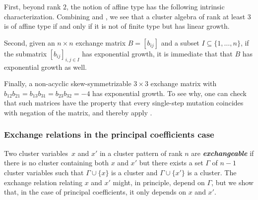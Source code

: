 \documentclass{amsart}
\theoremstyle{definition}
\theoremstyle{remark}
\numberwithin{equation}{section}
\newcommand{\newword}[1]{\textbf{\emph{#1}}}
\newcommand{\set}[1]{{\lbrace #1 \rbrace}}
\newcommand{\0}{{\mathbf{0}}}
\begin{document}
First, beyond rank $2$, the notion of affine type has the following intrinsic characterization.
Combining \cite[Theorem~3.5]{Seven} and \cite[Theorem~1.1]{FeShThTu12}, we see that a cluster algebra of rank at least $3$ is of affine type if and only if it is not of finite type but has linear growth.

Second, given an $n\times n$ exchange matrix $B=[b_{ij}]$ and a subset $I\subseteq\set{1,\ldots,n}$, if the submatrix $[b_{ij}]_{i,j\in I}$ has exponential growth, it is immediate that that $B$ has exponential growth as well.

Finally, a non-acyclic skew-symmetrizable $3\times3$ exchange matrix with $b_{12}b_{21}=b_{13}b_{31}=b_{23}b_{32}=-4$ has exponential growth.
To see why, one can check that such matrices have the property that every single-step mutation coincides with negation of the matrix, and thereby apply \cite[Theorem~1.1]{FeShThTu12}.

\subsubsection{Exchange relations in the principal coefficients case}\label{exch rel sec}
Two cluster variables~$x$ and $x'$ in a cluster pattern of rank $n$  are \newword{exchangeable} if there is no cluster containing both $x$ and $x'$ but there exists a set $\Gamma$ of $n-1$ cluster variables such that $\Gamma\cup\set{x}$ is a cluster and $\Gamma\cup\set{x'}$ is a cluster.
The exchange relation relating $x$ and $x'$ might, in principle, depend on $\Gamma$, but we show that, in the case of principal coefficients, it only depends on $x$ and $x'$.
\end{document}
